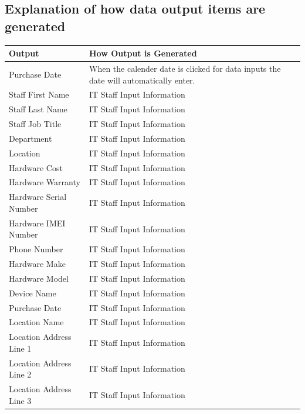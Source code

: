 \subsection{Explanation of how data output items are generated}

\begin{center}
    \begin{tabular}{|p{5cm}|p{5cm}|}
        \hline
        \textbf{Output} & \textbf{How Output is Generated}\\ \hline
	Purchase Date & When the calender date is clicked for data inputs the date will automatically enter.\\ \hline
	Staff First Name & IT Staff Input Information \\ \hline
	Staff Last Name & IT Staff Input Information \\ \hline
	Staff Job Title & IT Staff Input Information \\ \hline
	Department & IT Staff Input Information \\ \hline
	Location & IT Staff Input Information \\ \hline
	Hardware Cost & IT Staff Input Information \\ \hline
	Hardware Warranty & IT Staff Input Information \\ \hline
	Hardware Serial Number & IT Staff Input Information \\ \hline
	Hardware IMEI Number & IT Staff Input Information \\ \hline
	Phone Number & IT Staff Input Information \\ \hline
	Hardware Make & IT Staff Input Information \\ \hline
	Hardware Model & IT Staff Input Information \\ \hline
	Device Name & IT Staff Input Information \\ \hline
	Purchase Date & IT Staff Input Information \\ \hline
	Location Name & IT Staff Input Information \\ \hline
	Location Address Line 1 & IT Staff Input Information \\ \hline
	Location Address Line 2 & IT Staff Input Information \\ \hline
	Location Address Line 3 & IT Staff Input Information \\ \hline
    \end{tabular}
\end{center}

\newpage

